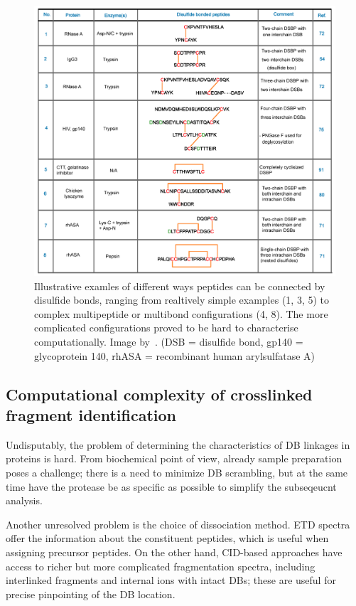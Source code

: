 \begin{figure}
  \centering
  \includegraphics[width=1\linewidth]{img/bond-types.png}
  \caption{Illustrative examles of different ways peptides can be connected by disulfide bonds, ranging from realtively simple examples (1, 3, 5) to complex multipeptide or multibond configurations (4, 8). The more complicated configurations proved to be hard to characterise computationally. Image by~\citet{lakbub2018recent}. (DSB = disulfide bond, gp140 = glycoprotein 140, rhASA = recombinant human arylsulfatase A)}\label{fig:bond-types}
\end{figure}


\subsection{Computational complexity of crosslinked fragment identification}

Undisputably, the problem of determining the characteristics of DB linkages in proteins is hard. From biochemical point of view, already sample preparation poses a challenge; there is a need to minimize DB scrambling, but at the same time have the protease be as specific as possible to simplify the subseqeucnt analysis.

Another unresolved problem is the choice of dissociation method. ETD spectra offer the information about the constituent peptides, which is useful when assigning precursor peptides. On the other hand, CID-based approaches have access to richer but more complicated fragmentation spectra, including interlinked fragments and internal ions with intact DBs; these are useful for precise pinpointing of the DB location.

